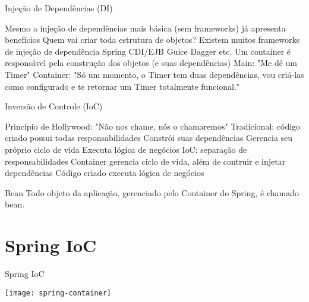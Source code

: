 \documentclass{beamer}
\begin{document}
\begin{frame}{Injeção de Dependências (DI)}
 \begin{outline}
   Mesmo a injeção de dependências mais básica (sem frameworks) já apresenta benefícios
     Quem vai criar toda estrutura de objetos?
   Existem muitos frameworks de injeção de dependência
    \2 Spring
    \2 CDI/EJB
    \2 Guice
    \2 Dagger
    \2 etc.
   Um container é responsável pela construção dos objetos (e suas dependências)
    \2 Main: "Me dê um Timer"
    \2 Container: "Só um momento, o Timer tem duas dependências, vou criá-las como configurado e te retornar um Timer totalmente funcional."
 \end{outline}
\end{frame}

\begin{frame}{Inversão de Controle (IoC)}
 \begin{outline}
   Princípio de Hollywood: "Não nos chame, nós o chamaremos"
   Tradicional: código criado possui todas responsabilidades
     Constrói suas dependências
     Gerencia seu próprio ciclo de vida
     Executa lógica de negócios
   IoC: separação de responsabilidades
    \2 Container gerencia ciclo de vida, além de contruir e injetar dependências
    \2 Código criado executa lógica de negócios
 \end{outline}
\end{frame}

\begin{frame}{Bean}
 Todo objeto da aplicação, gerenciado pelo Container do Spring, é chamado \alert{bean}.
 \begin{center}
 \end{center}
\end{frame}

\section{Spring IoC}

\begin{frame}{Spring IoC}
  \begin{center}
    \texttt{[image: spring-container]}
  \end{center}
\end{frame}
\end{document}
